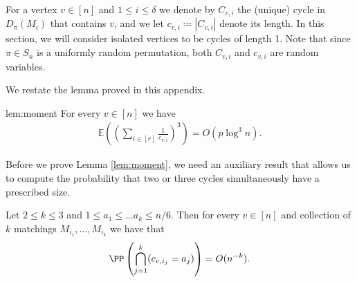 \documentclass{article}
\begin{document}
For a vertex $v \in [n]$ and $1 \leq i \leq \delta$ we denote by $C_{v,i}$ the (unique) cycle in $D_\pi(M_i)$ that contains $v$, and we let $c_{v,i} \coloneqq |C_{v,i}|$ denote its length. In this section, we will consider isolated vertices to be cycles of length 1.
Note that since $\pi \in S_n$ is a uniformly random permutation, both $C_{v,i}$ and $c_{v,i}$ are random variables.

We restate the lemma proved in this appendix.
\begin{replemma}{lem:moment}
	For every $v \in [n]$ we have
	\begin{align*}
	\mathbb E \left(\left(\sum_{i \in [r]} \frac{1}{c_{v,i}} \right)^3 \right) = O\left(p \log^3 n \right).
	\end{align*}
\end{replemma}

Before we prove Lemma \ref{lem:moment}, we need an auxiliary result that allows us to compute the probability that two or three cycles simultaneously have a prescribed size.

\begin{lemma}\label{lem:highmoments}
    Let $2\leq k\leq 3$ and $1\leq a_1\leq \ldots a_k \leq n/6$. Then for every $v \in [n]$ and collection of $k$ matchings $M_{i_1},\ldots, M_{i_k}$ we have that
\begin{align*}
    \PP\left(\bigcap_{j=1}^k (c_{v,i_{j}}=a_j)\right)=O(n^{-k}).
\end{align*}
\end{lemma}
\end{document}
